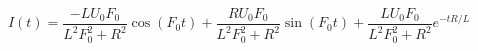 \documentclass{article}
\begin{document}
$$
I(t) = \frac{-L U_0 F_0}{L^2 F_0^2 + R^2}\cos(F_0t) +  \frac{R U_0 F_0}{L^2 F_0^2 + R^2}\sin(F_0 t) + \frac{L U_0 F_0}{L^2 F_0^2 + R^2}e^{-tR/L} 
$$
\end{document}
